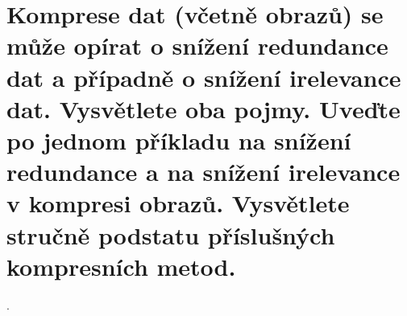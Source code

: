 \section{Komprese dat (včetně obrazů) se může opírat o snížení redundance dat a případně o snížení irelevance dat. 
Vysvětlete oba pojmy. Uveďte po jednom příkladu na snížení redundance a na snížení irelevance v kompresi obrazů. 
Vysvětlete stručně podstatu příslušných kompresních metod.}.